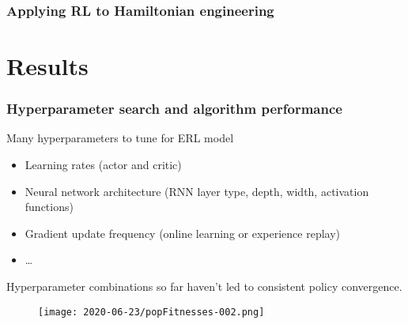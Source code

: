 \documentclass{beamer}
\begin{document}
\begin{frame}
\frametitle{Applying RL to Hamiltonian engineering}

\begin{table}
\label{tab:rl_ham}
\end{table}


\end{frame}

\section{Results}

\begin{frame}[allowframebreaks]
\frametitle{Hyperparameter search and algorithm performance}

Many hyperparameters to tune for ERL model
\begin{itemize}
    \item Learning rates (actor and critic)
    \item Neural network architecture (RNN layer type, depth, width, activation functions)
    \item Gradient update frequency (online learning or experience replay)
    \item \dots
\end{itemize}

Hyperparameter combinations so far haven't led to consistent policy convergence.
\begin{figure}
    \centering
    \texttt{[image: 2020-06-23/popFitnesses-002.png]}
    \label{fig:popFitnesses}
\end{figure}


\end{frame}
\end{document}
